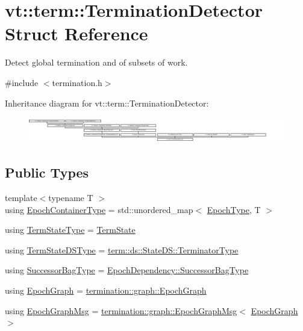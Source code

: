 \hypertarget{structvt_1_1term_1_1_termination_detector}{}\section{vt\+:\+:term\+:\+:Termination\+Detector Struct Reference}
\label{structvt_1_1term_1_1_termination_detector}


Detect global termination and of subsets of work.  




{\ttfamily \#include $<$termination.\+h$>$}

Inheritance diagram for vt\+:\+:term\+:\+:Termination\+Detector\+:\begin{figure}[H]
\begin{center}
\leavevmode
\includegraphics[height=1.142857cm]{structvt_1_1term_1_1_termination_detector}
\end{center}
\end{figure}
\subsection*{Public Types}
\begin{DoxyCompactItemize}
\item 
{\footnotesize template$<$typename T $>$ }\\using \hyperlink{structvt_1_1term_1_1_termination_detector_a69e2615b61e072977463eea5b20b7933}{Epoch\+Container\+Type} = std\+::unordered\+\_\+map$<$ \hyperlink{namespacevt_a81d11b28122d43bf9834577e4a06440f}{Epoch\+Type}, T $>$
\item 
using \hyperlink{structvt_1_1term_1_1_termination_detector_a0a47413bcb7bf5e10ecb31e7871a9268}{Term\+State\+Type} = \hyperlink{structvt_1_1term_1_1_term_state}{Term\+State}
\item 
using \hyperlink{structvt_1_1term_1_1_termination_detector_aa96c37b5c120063060c6418c48e64bd1}{Term\+State\+D\+S\+Type} = \hyperlink{structvt_1_1term_1_1ds_1_1_state_d_s_af98cfe31c25f710273ee103026d538e4}{term\+::ds\+::\+State\+D\+S\+::\+Terminator\+Type}
\item 
using \hyperlink{structvt_1_1term_1_1_termination_detector_ac8df9c8a604ee2073ce195a994aaf252}{Successor\+Bag\+Type} = \hyperlink{structvt_1_1term_1_1_epoch_dependency_a3f00b47c33158f3241ebbeb0a0cb7b1d}{Epoch\+Dependency\+::\+Successor\+Bag\+Type}
\item 
using \hyperlink{structvt_1_1term_1_1_termination_detector_af67f0ab522e54eb06d8ac541526155e3}{Epoch\+Graph} = \hyperlink{structvt_1_1termination_1_1graph_1_1_epoch_graph}{termination\+::graph\+::\+Epoch\+Graph}
\item 
using \hyperlink{structvt_1_1term_1_1_termination_detector_aec8abc5a3b161ac7df73ff3ba385dace}{Epoch\+Graph\+Msg} = \hyperlink{structvt_1_1termination_1_1graph_1_1_epoch_graph_msg}{termination\+::graph\+::\+Epoch\+Graph\+Msg}$<$ \hyperlink{structvt_1_1term_1_1_termination_detector_af67f0ab522e54eb06d8ac541526155e3}{Epoch\+Graph} $>$
\end{DoxyCompactItemize}
